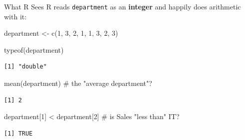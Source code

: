 \documentclass[
  ignorenonframetext,
  aspectratio=169,
]{beamer}
\newenvironment{Shaded}{\begin{snugshade}}{\end{snugshade}}
\newcommand{\CommentTok}[1]{\textcolor[rgb]{0.37,0.37,0.37}{#1}}
\newcommand{\DecValTok}[1]{\textcolor[rgb]{0.68,0.00,0.00}{#1}}
\newcommand{\FunctionTok}[1]{\textcolor[rgb]{0.28,0.35,0.67}{#1}}
\newcommand{\NormalTok}[1]{\textcolor[rgb]{0.00,0.23,0.31}{#1}}
\newcommand{\OtherTok}[1]{\textcolor[rgb]{0.00,0.23,0.31}{#1}}
\newcommand{\SpecialCharTok}[1]{\textcolor[rgb]{0.37,0.37,0.37}{#1}}
\begin{document}
\begin{frame}[fragile]{What R Sees}
\protect\hypertarget{what-r-sees}{}
R reads \texttt{department} as an \textbf{integer} and happily does
arithmetic with it:

\begin{Shaded}
\begin{Highlighting}[]
\NormalTok{department }\OtherTok{\textless{}{-}} \FunctionTok{c}\NormalTok{(}\DecValTok{1}\NormalTok{, }\DecValTok{3}\NormalTok{, }\DecValTok{2}\NormalTok{, }\DecValTok{1}\NormalTok{, }\DecValTok{1}\NormalTok{, }\DecValTok{3}\NormalTok{, }\DecValTok{2}\NormalTok{, }\DecValTok{3}\NormalTok{)}

\FunctionTok{typeof}\NormalTok{(department)}
\end{Highlighting}
\end{Shaded}

\begin{verbatim}
[1] "double"
\end{verbatim}

\begin{Shaded}
\begin{Highlighting}[]
\FunctionTok{mean}\NormalTok{(department)                }\CommentTok{\# the "average department"?}
\end{Highlighting}
\end{Shaded}

\begin{verbatim}
[1] 2
\end{verbatim}

\begin{Shaded}
\begin{Highlighting}[]
\NormalTok{department[}\DecValTok{1}\NormalTok{] }\SpecialCharTok{\textless{}}\NormalTok{ department[}\DecValTok{2}\NormalTok{]   }\CommentTok{\# is Sales "less than" IT?}
\end{Highlighting}
\end{Shaded}

\begin{verbatim}
[1] TRUE
\end{verbatim}
\end{frame}
\end{document}
